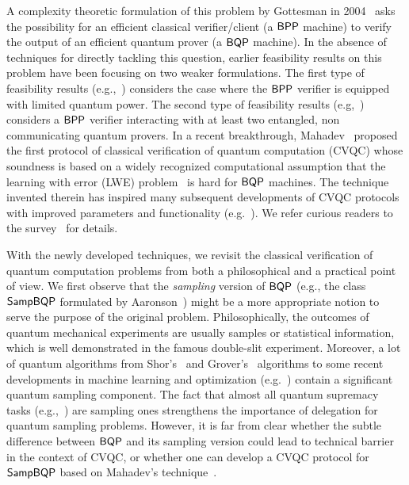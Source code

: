 A complexity theoretic formulation of this problem by Gottesman in 2004~\cite{web:Aaronson} asks the possibility for an efficient classical verifier/client (a $\operatorname{\mathsf{BPP}}$ machine) to verify the output of an
efficient quantum prover (a $\operatorname{\mathsf{BQP}}$ machine).
In the absence of techniques for directly tackling this question, earlier feasibility results on this problem have been focusing on two weaker formulations.
The first type of feasibility results (e.g.,~\cite{BFK09,arXiv:ABOEM17,FK17,mf16}) considers the case where the $\operatorname{\mathsf{BPP}}$ verifier is equipped with limited quantum power.
The second type of feasibility results (e.g,~\cite{Nat:RUV13, CGJV19, Gheorghiu_2015, HPF15})
considers a $\operatorname{\mathsf{BPP}}$ verifier interacting with at least two entangled, non communicating quantum provers.
In a recent breakthrough, Mahadev~\cite{FOCS:Mahadev18a} proposed the first protocol of classical verification of quantum computation (CVQC) whose soundness is based on a widely recognized computational assumption that the learning with error (LWE) problem~\cite{JACM:Regev09} is hard for $\operatorname{\mathsf{BQP}}$ machines.
The technique invented therein has inspired many  subsequent developments of CVQC protocols with improved parameters and functionality (e.g.~\cite{FOCS:GheVid19,arXiv:AlaChiHun19,arXiv:ChiaChungYam19}).
We refer curious readers to the survey~\cite{survey:GKK19} for details.

With the newly developed techniques, we revisit the classical verification of quantum computation problems from both a philosophical and a practical point of view.
We first observe that the \emph{sampling} version of $\operatorname{\mathsf{BQP}}$ (e.g., the class $\operatorname{\mathsf{SampBQP}}$ formulated by Aaronson~\cite{aaronson_2013}) might be a more appropriate notion to serve the purpose of the original problem.
Philosophically, the outcomes of quantum mechanical experiments are usually samples or statistical information, which is well demonstrated in the famous double-slit experiment.
Moreover, a lot of quantum algorithms from Shor's~\cite{Shor} and Grover's~\cite{Grover} algorithms to some recent developments in machine learning and optimization (e.g.~\cite{brando_et_al:LIPIcs:2019:10603, AGGW17,pmlr-v97-li19b}) contain a significant quantum sampling component.
The fact that almost all quantum supremacy tasks (e.g.,~\cite{Boson, IQP, nature-google}) are sampling ones strengthens the importance of delegation for quantum sampling problems.
However, it is far from clear whether the subtle difference between $\operatorname{\mathsf{BQP}}$ and its sampling version could lead to
technical barrier in the context of CVQC, or
whether one can develop a CVQC protocol for $\operatorname{\mathsf{SampBQP}}$ based on Mahadev's technique~\cite{FOCS:Mahadev18a}.


